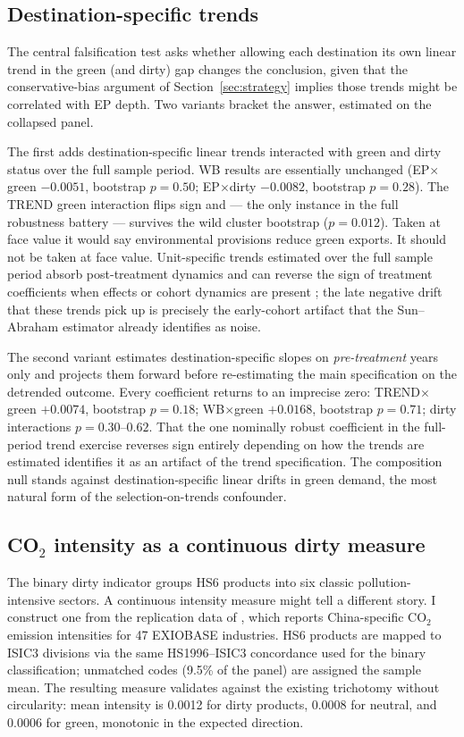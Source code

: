 \documentclass[12pt]{article}
\begin{document}
\subsection{Destination-specific trends}

The central falsification test asks whether allowing each destination its own linear
trend in the green (and dirty) gap changes the conclusion, given that the conservative-bias
argument of Section~\ref{sec:strategy} implies those trends might be correlated with EP
depth. Two variants bracket the answer, estimated on the collapsed panel.

The first adds destination-specific linear trends interacted with green and dirty status
over the full sample period. WB results are essentially unchanged (EP$\times$green
$-0.0051$, bootstrap $p = 0.50$; EP$\times$dirty $-0.0082$, bootstrap $p = 0.28$). The
TREND green interaction flips sign and --- the only instance in the full robustness
battery --- survives the wild cluster bootstrap ($p = 0.012$). Taken at face value it
would say environmental provisions reduce green exports. It should not be taken at face
value. Unit-specific trends estimated over the full sample period absorb post-treatment
dynamics and can reverse the sign of treatment coefficients when effects or cohort
dynamics are present \citep{wolfers2006}; the late negative drift that these trends pick
up is precisely the early-cohort artifact that the Sun--Abraham estimator already
identifies as noise.

The second variant estimates destination-specific slopes on \emph{pre-treatment} years
only and projects them forward before re-estimating the main specification on the
detrended outcome. Every coefficient returns to an imprecise zero: TREND$\times$green
$+0.0074$, bootstrap $p = 0.18$; WB$\times$green $+0.0168$, bootstrap $p = 0.71$; dirty
interactions $p = 0.30$--$0.62$. That the one nominally robust coefficient in the
full-period trend exercise reverses sign entirely depending on how the trends are
estimated identifies it as an artifact of the trend specification. The composition null
stands against destination-specific linear drifts in green demand, the most natural form
of the selection-on-trends confounder.

\subsection{CO$_2$ intensity as a continuous dirty measure}

The binary dirty indicator groups HS6 products into six classic pollution-intensive
sectors. A continuous intensity measure might tell a different story. I construct one
from the replication data of \citet{shapiro2021}, which reports China-specific CO$_2$
emission intensities for 47 EXIOBASE industries. HS6 products are mapped to ISIC3
divisions via the same HS1996--ISIC3 concordance used for the binary classification;
unmatched codes (9.5\% of the panel) are assigned the sample mean. The resulting measure
validates against the existing trichotomy without circularity: mean intensity is 0.0012
for dirty products, 0.0008 for neutral, and 0.0006 for green, monotonic in the expected
direction.
\end{document}
